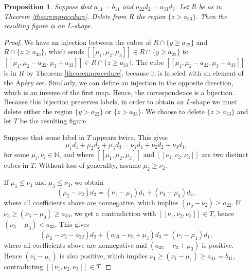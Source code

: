 \documentclass[12pt]{article}
\newtheorem{prop}[thm]{Proposition}
\theoremstyle{remark}
\begin{document}
\begin{prop}\label{propnottrick}
    Suppose that $a_{11} = b_{11}$ and $a_{22}d_2 = a_{33}d_3$. Let $R$ be as in Theorem \ref{theoremprocedure}. Delete from $R$ the region $\{z > a_{33}\}$. Then the resulting figure is an $L$-shape.
\end{prop}
\begin{proof}
    We have an injection between the cubes of $R \cap \{ y \geq a_{22}\}$ and $R \cap \{ z \geq a_{33}\}$, which sends $[[\mu_1,\mu_2,\mu_3]] \in R \cap \{ y \geq a_{22}\} $ to $[[\mu_1,\mu_2 - a_{22},\mu_3 + a_{33}]] \in R \cap \{ z \geq a_{33}\}$. The cube $[[\mu_1,\mu_2 - a_{22},\mu_3 + a_{33}]]$ is in $R$ by Theorem \ref{theoremprocedure}, because it is labeled with an element of the Ap{\'e}ry set. Similarly, we can define an injection in the opposite direction, which is an inverse of the first map. Hence, the correspondence is a bijection. Because this bijection preserves labels, in order to obtain an $L$-shape we must delete either the region $\{y > a_{22}\}$ or $\{z > a_{33}\}$. We choose to delete $\{z > a_{33}\}$ and let $T$ be the resulting figure.   
     
    Suppose that some label in $T$ appears twice. This gives
    \begin{equation}\label{propnottrick-eq1}
        \mu_1d_1 + \mu_2d_2 + \mu_3d_3 = \nu_1d_1 + \nu_2d_2 + \nu_3d_3,
    \end{equation}
    for some $\mu_i, \nu_i \in \mathbb{N}$, and where $[[\mu_1,\mu_2,\mu_3]]$ and $[[\nu_1,\nu_2,\nu_3]]$ are two distinct cubes in $T$. Without loss of generality, assume $\mu_2 \geq \nu_2$. 
    
    If $\mu_1 \leq \nu_1$ and $\mu_3 \leq \nu_3$, we obtain
    \begin{equation}\label{propnottrick-eq2}
         (\mu_2-\nu_2)d_2  = (\nu_1-\mu_1)d_1  + (\nu_3-\mu_3)d_3,
    \end{equation}
    where all coefficients above are nonnegative, which implies $(\mu_2-\nu_2) \geq a_{22}$. If $\nu_3 \geq (\nu_3-\mu_3) \geq a_{33}$, we get a contradiction with $[[\nu_1,\nu_2,\nu_3]] \in T$, hence $(\nu_3-\mu_3) < a_{33}$. This gives
    \begin{equation}\label{propnottrick-eq21}
         (\mu_2-\nu_2-a_{22})d_2 + (a_{33}-\nu_3+\mu_3)d_3  = (\nu_1-\mu_1)d_1,
    \end{equation}
    where all coefficients above are nonnegative and $(a_{33}-\nu_3+\mu_3)$ is positive. Hence $(\nu_1-\mu_1)$ is also positive, which implies $\nu_1 \geq (\nu_1-\mu_1) \geq a_{11} = b_{11}$, contradicting $[[\nu_1,\nu_2,\nu_3]] \in T$.


\end{proof}
\end{document}
